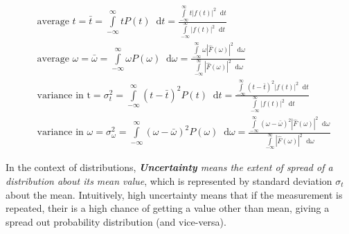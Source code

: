 \documentclass[11pt, a4paper]{article}
\newcommand{\variance}[1]{\sigma_{#1}^{2}}
\newcommand{\stdev}[1]{\sigma_{#1}}
\newcommand{\diff}{\mathop{}\!\mathrm{d}}
\newcommand{\dt}{\diff t}
\newcommand{\domega}{\diff \omega}
\newcommand{\dint}[2]{\int \limits_{#1}^{#2}}  %
\newcommand{\intinfty}{\dint{-\infty}{\infty}}	%
\begin{document}
	\begin{subequations}
		\begin{align}
			& \text{average } t = \bar{t} = \intinfty t P(t) \dt = \frac{\intinfty t |f(t)|^{2} \dt}{\intinfty |f(t)|^{2} \dt} \label{eq:avg_t} \\
			& \text{average } \omega = \bar{\omega} = \intinfty \omega P(\omega) \domega = \frac{\intinfty \omega |\hat{F}(\omega)|^{2} \domega}{\intinfty |\hat{F}(\omega)|^{2} \domega} \label{eq:avg_omega} \\
			& \text{variance in t} = \variance{t} = \intinfty (t - \bar{t})^{2} P(t) \dt = \frac{\intinfty (t - \bar{t})^{2} |f(t)|^{2} \dt}{\intinfty |f(t)|^{2} \dt} \label{eq:variance_t} \\
			& \text{variance in $\omega$} = \variance{\omega} = \intinfty (\omega - \bar{\omega})^{2} P(\omega) \domega = \frac{\intinfty (\omega - \bar{\omega})^{2} |\hat{F}(\omega)|^{2} \domega}{\intinfty |\hat{F}(\omega)|^{2} \domega} \label{eq:variance_omega}
		\end{align}
	\end{subequations}
	
	In the context of distributions, \textit{\textbf{Uncertainty} means the extent of spread of a distribution about its mean value}, which is represented by standard deviation $\stdev{t}$ about the mean. Intuitively, high uncertainty means that if the measurement is repeated, their is a high chance of getting a value other than mean, giving a spread out probability distribution (and vice-versa).
	
\end{document}
